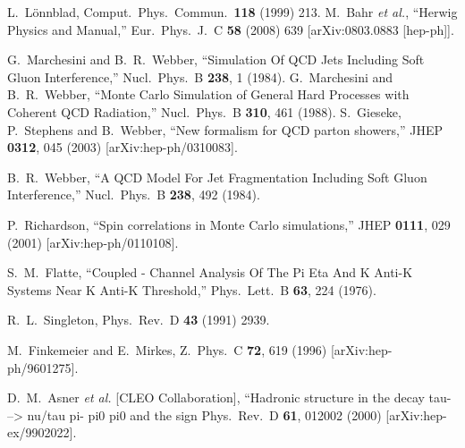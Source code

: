 \documentclass{article}
\begin{document}
\begin{thebibliography}{99}
 L.~L\"onnblad, Comput.~Phys.~Commun.\ {\bf 118} (1999) 213.
  M.~Bahr {\it et al.},
  ``Herwig Physics and Manual,''
  Eur.\ Phys.\ J.\  C {\bf 58} (2008) 639
  [arXiv:0803.0883 [hep-ph]].

  G.~Marchesini and B.~R.~Webber,
  ``Simulation Of QCD Jets Including Soft Gluon Interference,''
  Nucl.\ Phys.\  B {\bf 238}, 1 (1984).
  G.~Marchesini and B.~R.~Webber,
   ``Monte Carlo Simulation of General Hard Processes with Coherent QCD
  Radiation,''
  Nucl.\ Phys.\  B {\bf 310}, 461 (1988).
  S.~Gieseke, P.~Stephens and B.~Webber,
  ``New formalism for QCD parton showers,''
  JHEP {\bf 0312}, 045 (2003)
  [arXiv:hep-ph/0310083].

  B.~R.~Webber,
  ``A QCD Model For Jet Fragmentation Including Soft Gluon Interference,''
  Nucl.\ Phys.\  B {\bf 238}, 492 (1984).

  P.~Richardson,
  ``Spin correlations in Monte Carlo simulations,''
  JHEP {\bf 0111}, 029 (2001)
  [arXiv:hep-ph/0110108].

  S.~M.~Flatte,
   ``Coupled - Channel Analysis Of The Pi Eta And K Anti-K Systems Near K Anti-K
  Threshold,''
  Phys.\ Lett.\  B {\bf 63}, 224 (1976).

  R.~L.~Singleton,
  Phys.\ Rev.\  D {\bf 43} (1991) 2939.

  M.~Finkemeier and E.~Mirkes,
  Z.\ Phys.\  C {\bf 72}, 619 (1996)
  [arXiv:hep-ph/9601275].

  D.~M.~Asner {\it et al.}  [CLEO Collaboration],
   ``Hadronic structure in the decay tau- --> nu/tau pi- pi0 pi0 and the  sign
  Phys.\ Rev.\  D {\bf 61}, 012002 (2000)
  [arXiv:hep-ex/9902022].


\end{thebibliography}
\end{document}
